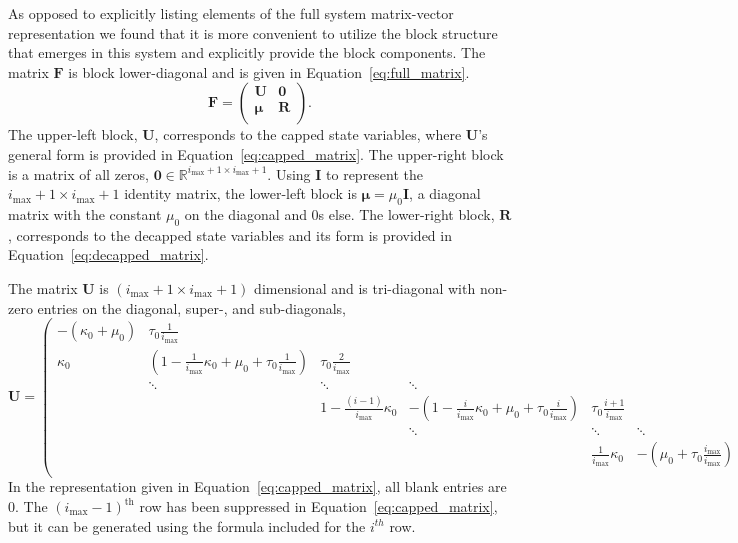 \documentclass[review]{elsarticle}
\newcommand{\imax}{\ensuremath{i_{\max}}\xspace}
\let\bs\boldsymbol
\begin{document}
As opposed to explicitly listing elements of the full system matrix-vector representation we found that it is more convenient to utilize the block structure that emerges in this system and explicitly provide the block components.
The matrix $\bs{F}$ is block lower-diagonal and is given in Equation~\ref{eq:full_matrix}.
\begin{equation}
\label{eq:full_matrix}
\bs{F}=\left(\begin{array}{cc}
\bs{U} & \bs{0} \\
\bs{\mu} & \bs{R} \\
\end{array} \right).
\end{equation}
The upper-left block, $\bs{U}$, corresponds to the capped state variables, where $\bs{U}$'s general form is provided in Equation~\ref{eq:capped_matrix}.
The upper-right block is a matrix of all zeros, $\bs{0}\in\mathbb{R}^{\imax+1\times \imax+1}$.
Using $\bs{I}$ to represent the $\imax+1\times \imax+1$ identity matrix, the lower-left block is $\bs{\mu}=\mu_0\bs{I}$, a diagonal matrix with the constant $\mu_0$ on the diagonal and 0s else.
The lower-right block, $\bs{R}$, corresponds to the decapped state variables and its form is provided in Equation~\ref{eq:decapped_matrix}.

The matrix $\bs{U}$ is $(\imax+1\times \imax+1)$ dimensional and is tri-diagonal with non-zero entries on the diagonal, super-, and sub-diagonals,
\begin{equation}\label{eq:capped_matrix}
\bs{U}=\left(\begin{array}{cccccc}
-(\kappa_0+\mu_0) & \tau_0\frac{1}{\imax} &  &  &  & \\
\kappa_0 & \left(1-\frac{1}{\imax} \kappa_0+\mu_0+\tau_0\frac{1}{\imax}\right) & \tau_0\frac{2}{\imax} &  &  & \\
   &\ddots        & \ddots        & \ddots & &  \\
   & &    1-\frac{(i-1)}{\imax}\kappa_0 & -\left(1-\frac{i}{\imax}\kappa_0+\mu_0+\tau_0\frac{i}{\imax}\right) & \tau_0\frac{i+1}{\imax} & \\
                  &         &        & \ddots  & \ddots & \ddots \\
     
                          &        &  &  & \frac{1}{\imax}\kappa_0 & -\left(\mu_0+\tau_0\frac{\imax}{\imax}\right) \\
\end{array}\right).
\end{equation}
In the representation given in Equation~\ref{eq:capped_matrix}, all blank entries are 0.
The $(\imax-1)^{\text{th}}$ row has been suppressed in Equation~\ref{eq:capped_matrix}, but it can be generated using the formula included for the $i^{th}$ row.
\end{document}
